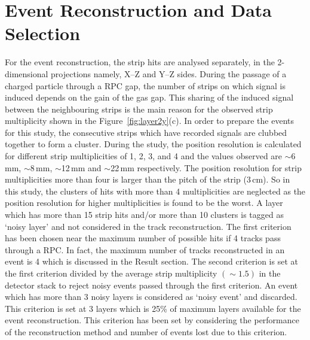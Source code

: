 \section{Event Reconstruction and Data Selection}\label{sec:reconstrction}
For the event reconstruction, the strip hits are
analysed separately, in the 2-dimensional projections namely,
\mbox{X--Z} and \mbox{Y--Z} sides. During the passage of a charged
particle through a RPC gap, the number of strips on which signal is
induced depends on the gain of the gas gap. This sharing of the induced
signal between the neighbouring strips is the main reason for the
observed strip multiplicity shown in the Figure~\ref{fig:layer2y}(c).
In order to prepare the events for this study, the consecutive strips
which have recorded signals are clubbed together to form a cluster.
During the study, the position resolution is calculated for different
strip multiplicities of 1, 2, 3, and 4 and the values observed are
$\sim$6\,mm, $\sim$8\,mm, $\sim$12\,mm and $\sim$22\,mm respectively.
The position resolution for strip multiplicities more than four is
larger than the pitch of the strip (3\,cm). So in this study,
the clusters of hits with more than 4 multiplicities are neglected
as the position resolution for higher multiplicities is found to be
the worst.
A layer which has more than 15 strip hits and/or more than 10 clusters
is tagged as `noisy layer' and not considered in the track
reconstruction. The first criterion has been chosen near the maximum
number of possible hits if 4 tracks pass through a RPC.
In fact, the maximum number of tracks reconstructed in an event is 4
which is discussed in the Result section. The second criterion is set
at the first criterion divided by the average strip multiplicity
$\left(\sim 1.5\right)$ in the detector stack to reject noisy events
passed through the first criterion.
An event which has more than 3 noisy layers is considered as `noisy
event' and discarded. This criterion is set at 3 layers which is 25\%
of maximum layers available for the event reconstruction. This
criterion has been set by considering the performance of the
reconstruction method and number of events lost due to this criterion.

